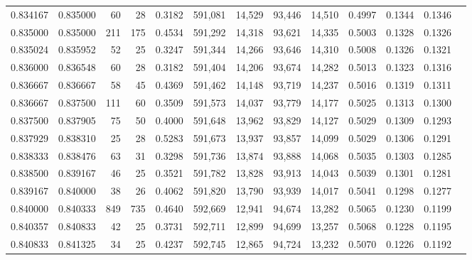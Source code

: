 \begin{tabular}{rrrrrrrrrrrrr}
0.834167 & 0.835000 &    60 &  28 &                                     0.3182 & 591,081 &  14,529 &  93,446 &  14,510 & 0.4997 & 0.1344 & 0.1346 \\
0.835000 & 0.835000 &   211 & 175 &                                     0.4534 & 591,292 &  14,318 &  93,621 &  14,335 & 0.5003 & 0.1328 & 0.1326 \\
0.835024 & 0.835952 &    52 &  25 &                                     0.3247 & 591,344 &  14,266 &  93,646 &  14,310 & 0.5008 & 0.1326 & 0.1321 \\
0.836000 & 0.836548 &    60 &  28 &                                     0.3182 & 591,404 &  14,206 &  93,674 &  14,282 & 0.5013 & 0.1323 & 0.1316 \\
0.836667 & 0.836667 &    58 &  45 &                                     0.4369 & 591,462 &  14,148 &  93,719 &  14,237 & 0.5016 & 0.1319 & 0.1311 \\
0.836667 & 0.837500 &   111 &  60 &                                     0.3509 & 591,573 &  14,037 &  93,779 &  14,177 & 0.5025 & 0.1313 & 0.1300 \\
0.837500 & 0.837905 &    75 &  50 &                                     0.4000 & 591,648 &  13,962 &  93,829 &  14,127 & 0.5029 & 0.1309 & 0.1293 \\
0.837929 & 0.838310 &    25 &  28 &                                     0.5283 & 591,673 &  13,937 &  93,857 &  14,099 & 0.5029 & 0.1306 & 0.1291 \\
0.838333 & 0.838476 &    63 &  31 &                                     0.3298 & 591,736 &  13,874 &  93,888 &  14,068 & 0.5035 & 0.1303 & 0.1285 \\
0.838500 & 0.839167 &    46 &  25 &                                     0.3521 & 591,782 &  13,828 &  93,913 &  14,043 & 0.5039 & 0.1301 & 0.1281 \\
0.839167 & 0.840000 &    38 &  26 &                                     0.4062 & 591,820 &  13,790 &  93,939 &  14,017 & 0.5041 & 0.1298 & 0.1277 \\
0.840000 & 0.840333 &   849 & 735 &                                     0.4640 & 592,669 &  12,941 &  94,674 &  13,282 & 0.5065 & 0.1230 & 0.1199 \\
0.840357 & 0.840833 &    42 &  25 &                                     0.3731 & 592,711 &  12,899 &  94,699 &  13,257 & 0.5068 & 0.1228 & 0.1195 \\
0.840833 & 0.841325 &    34 &  25 &                                     0.4237 & 592,745 &  12,865 &  94,724 &  13,232 & 0.5070 & 0.1226 & 0.1192 \\

\end{tabular}
